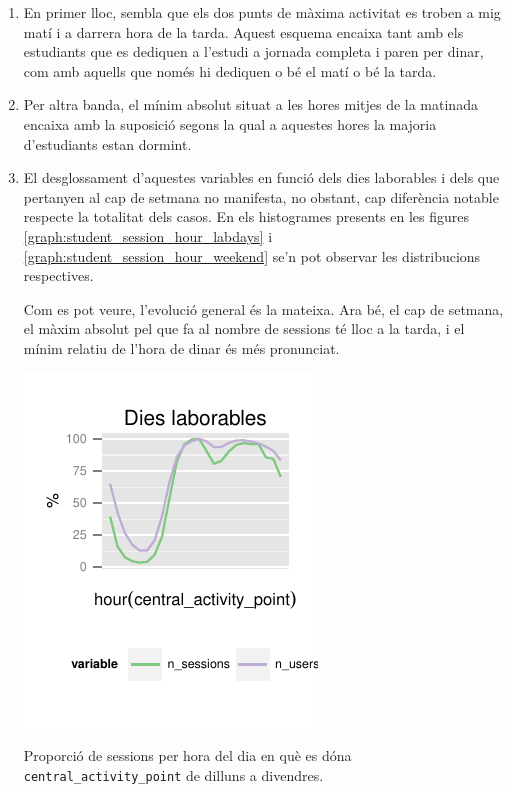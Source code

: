 \documentclass[
	a4paper,
	twoside,
	justified
]{tufte-book}
\begin{document}
\begin{enumerate}[(1)]

\item En primer lloc, sembla que els dos punts de màxima activitat es troben a mig matí i a darrera hora de la tarda. Aquest esquema encaixa tant amb els estudiants que es dediquen a l'estudi a jornada completa i paren per dinar, com amb aquells que només hi dediquen o bé el matí o bé la tarda.

\item Per altra banda, el mínim absolut situat a les hores mitjes de la matinada encaixa amb la suposició segons la qual a aquestes hores la majoria d'estudiants estan dormint.

\item El desglossament d'aquestes variables en funció dels dies laborables i dels que pertanyen al cap de setmana no manifesta, no obstant, cap diferència notable respecte la totalitat dels casos. En els histogrames presents en les figures \ref{graph:student_session_hour_labdays} i \ref{graph:student_session_hour_weekend} se'n pot observar les distribucions respectives. 

Com es pot veure, l'evolució general és la mateixa. Ara bé, el cap de setmana, el màxim absolut pel que fa al nombre de sessions té lloc a la tarda, i el mínim relatiu de l'hora de dinar és més pronunciat.   

\begin{marginfigure}
\begin{center}
\includegraphics{student_session_hour_labdays}
\caption{
	\label{graph:student_session_hour_labdays}
	Proporció de sessions per hora del dia en què es dóna \texttt{central\_activity\_point} de dilluns a divendres. 
}
\end{center}
\end{marginfigure}


\end{enumerate}
\end{document}
